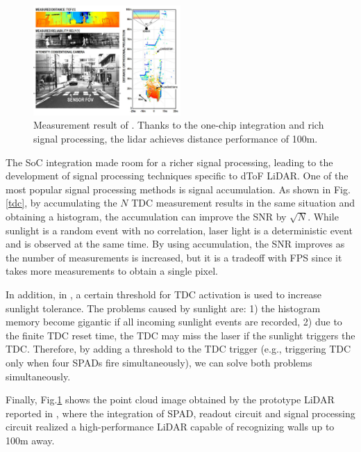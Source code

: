 \documentclass[paper]{ieice}
\begin{document}
\begin{figure}[!t]
\centering
 \includegraphics[width=0.5\textwidth]{figs/distance_image.png}
  \caption{Measurement result of \cite{niclass2012100}. Thanks to the one-chip integration and rich signal processing, the lidar achieves distance performance of 100m.}
\label{meas}
\end{figure}

\qquad The SoC integration made room for a richer signal processing, leading to the development of signal processing techniques specific to dToF LiDAR. One of the most popular signal processing methods is signal accumulation. As shown in Fig.\ref{tdc}, by accumulating the $N$ TDC measurement results in the same situation and obtaining a histogram, the accumulation can improve the SNR by $\sqrt{N}$. While sunlight is a random event with no correlation, laser light is a deterministic event and is observed at the same time. By using accumulation, the SNR improves as the number of measurements is increased, but it is a tradeoff with FPS since it takes more measurements to obtain a single pixel.

In addition, in \cite{niclass2012100}, a certain threshold for TDC activation is used to increase sunlight tolerance.
The problems caused by sunlight are: 1) the histogram memory become gigantic if all incoming sunlight events are recorded, 2) due to the finite TDC reset time, the TDC may miss the laser if the sunlight triggers the TDC. Therefore, by adding a threshold to the TDC trigger (e.g., triggering TDC only when four SPADs fire simultaneously), we can solve both problems simultaneously.

Finally, Fig.\ref{meas} shows the point cloud image obtained by the prototype LiDAR reported in \cite{niclass2012100}, where the integration of SPAD, readout circuit and signal processing circuit realized a high-performance LiDAR capable of recognizing walls up to 100m away.
\end{document}
